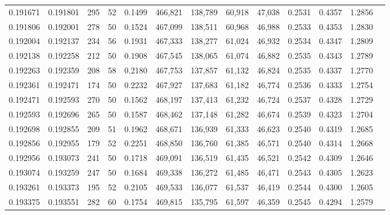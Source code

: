 \begin{tabular}{rrrrrrrrrrrrr}
0.191671 & 0.191801 &   295 &  52 &                                     0.1499 & 466,821 & 138,789 &  60,918 &  47,038 & 0.2531 & 0.4357 & 1.2856 \\
0.191806 & 0.192001 &   278 &  50 &                                     0.1524 & 467,099 & 138,511 &  60,968 &  46,988 & 0.2533 & 0.4353 & 1.2830 \\
0.192004 & 0.192137 &   234 &  56 &                                     0.1931 & 467,333 & 138,277 &  61,024 &  46,932 & 0.2534 & 0.4347 & 1.2809 \\
0.192138 & 0.192258 &   212 &  50 &                                     0.1908 & 467,545 & 138,065 &  61,074 &  46,882 & 0.2535 & 0.4343 & 1.2789 \\
0.192263 & 0.192359 &   208 &  58 &                                     0.2180 & 467,753 & 137,857 &  61,132 &  46,824 & 0.2535 & 0.4337 & 1.2770 \\
0.192361 & 0.192471 &   174 &  50 &                                     0.2232 & 467,927 & 137,683 &  61,182 &  46,774 & 0.2536 & 0.4333 & 1.2754 \\
0.192471 & 0.192593 &   270 &  50 &                                     0.1562 & 468,197 & 137,413 &  61,232 &  46,724 & 0.2537 & 0.4328 & 1.2729 \\
0.192593 & 0.192696 &   265 &  50 &                                     0.1587 & 468,462 & 137,148 &  61,282 &  46,674 & 0.2539 & 0.4323 & 1.2704 \\
0.192698 & 0.192855 &   209 &  51 &                                     0.1962 & 468,671 & 136,939 &  61,333 &  46,623 & 0.2540 & 0.4319 & 1.2685 \\
0.192856 & 0.192955 &   179 &  52 &                                     0.2251 & 468,850 & 136,760 &  61,385 &  46,571 & 0.2540 & 0.4314 & 1.2668 \\
0.192956 & 0.193073 &   241 &  50 &                                     0.1718 & 469,091 & 136,519 &  61,435 &  46,521 & 0.2542 & 0.4309 & 1.2646 \\
0.193074 & 0.193259 &   247 &  50 &                                     0.1684 & 469,338 & 136,272 &  61,485 &  46,471 & 0.2543 & 0.4305 & 1.2623 \\
0.193261 & 0.193373 &   195 &  52 &                                     0.2105 & 469,533 & 136,077 &  61,537 &  46,419 & 0.2544 & 0.4300 & 1.2605 \\
0.193375 & 0.193551 &   282 &  60 &                                     0.1754 & 469,815 & 135,795 &  61,597 &  46,359 & 0.2545 & 0.4294 & 1.2579 \\

\end{tabular}
